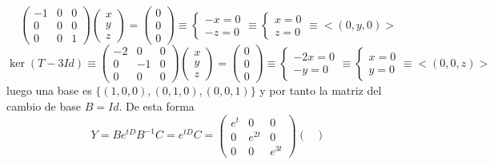 \begin{enumerate}
\begin{sol}
$$\begin{pmatrix}
        -1 & 0 & 0 \\
        0 & 0 & 0 \\
        0 & 0 & 1
    \end{pmatrix} \begin{pmatrix}
        x \\ y \\ z
    \end{pmatrix}=\begin{pmatrix}
        0 \\ 0 \\ 0
    \end{pmatrix}\equiv \left\{ \begin{array}{l}
         -x=0  \\
          -z=0
    \end{array} \right.\equiv \left\{ \begin{array}{l}
         x=0  \\
        z=0
    \end{array} \right. \equiv  <(0,y,0)>$$
    $$\ker (T-3Id) \equiv \begin{pmatrix}
        -2 & 0 & 0 \\
        0 & -1 & 0 \\
        0 & 0 & 0
    \end{pmatrix}\begin{pmatrix}
        x \\ y \\ z
    \end{pmatrix}=\begin{pmatrix}
        0 \\ 0 \\ 0
    \end{pmatrix} \equiv \left\{ \begin{array}{l}
         -2x=0  \\
          -y=0
    \end{array} \right. \equiv \left\{ \begin{array}{l}
         x=0  \\
         y=0
    \end{array} \right. \equiv <(0,0,z)> $$
    luego una base es $\{(1,0,0),(0,1,0),(0,0,1)\}$ y por tanto la matriz del cambio de base $B=Id$. De esta forma
    $$Y=B e^{tD} B^{-1} C=e^{tD} C=\begin{pmatrix}
        e^t & 0 & 0 \\
        0 & e^{2t} & 0 \\
        0 & 0 & e^{3t}
    \end{pmatrix} \begin{pmatrix}

\end{pmatrix}$$
\end{sol}
\end{enumerate}
